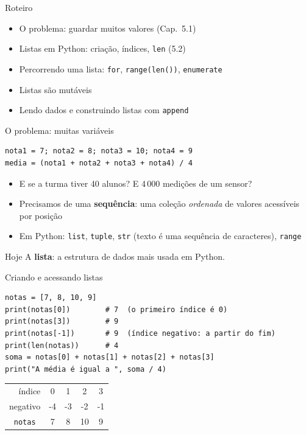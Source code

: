 \documentclass[aspectratio=169,10pt,t]{beamer}
\begin{document}
\capa

\begin{frame}{Roteiro}
  \begin{itemize}
    \item O problema: guardar muitos valores (Cap.~5.1)
    \item Listas em Python: criação, índices, \texttt{len} (5.2)
    \item Percorrendo uma lista: \texttt{for}, \texttt{range(len())}, \texttt{enumerate}
    \item Listas são \alert{mutáveis}
    \item Lendo dados e construindo listas com \texttt{append}
  \end{itemize}
\end{frame}

\begin{frame}[fragile]{O problema: muitas variáveis}
\begin{lstlisting}
nota1 = 7; nota2 = 8; nota3 = 10; nota4 = 9
media = (nota1 + nota2 + nota3 + nota4) / 4
\end{lstlisting}
  \begin{itemize}
    \item E se a turma tiver 40 alunos? E 4\,000 medições de um sensor?
    \item Precisamos de uma \textbf{sequência}: uma coleção \emph{ordenada} de valores acessíveis por posição
    \item Em Python: \texttt{list}, \texttt{tuple}, \texttt{str} (texto é uma sequência de caracteres), \texttt{range}
  \end{itemize}
  \begin{exampleblock}{Hoje}
    A \textbf{lista}: a estrutura de dados mais usada em Python.
  \end{exampleblock}
\end{frame}

\begin{frame}[fragile]{Criando e acessando listas}
\begin{lstlisting}
notas = [7, 8, 10, 9]
print(notas[0])        # 7  (o primeiro índice é 0)
print(notas[3])        # 9
print(notas[-1])       # 9  (índice negativo: a partir do fim)
print(len(notas))      # 4
soma = notas[0] + notas[1] + notas[2] + notas[3]
print("A média é igual a ", soma / 4)
\end{lstlisting}
  \begin{center}\small
    \begin{tabular}{c|c|c|c|c}
      \multicolumn{1}{r}{índice} & 0 & 1 & 2 & 3\\
      \multicolumn{1}{r}{negativo} & -4 & -3 & -2 & -1\\\hline
      \texttt{notas} & 7 & 8 & 10 & 9\\
    \end{tabular}
  \end{center}
\end{frame}
\end{document}
